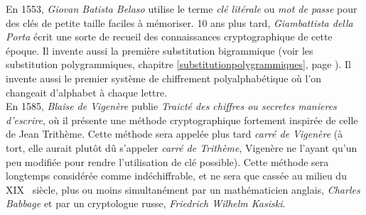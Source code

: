 



En 1553, \emph{Giovan Batista Belaso} utilise le terme \emph{clé
  litérale} ou \emph{mot de passe} pour des clés de petite taille
faciles à mémoriser. %
10 ans plus tard, \emph{Giambattista della Porta} écrit une sorte
de recueil des connaissances cryptographique de cette époque. Il
invente aussi la première substitution bigrammique (voir les
substitution polygrammiques, chapitre
\ref{substitutionpolygrammiques}, page
\pageref{substitutionpolygrammiques}). Il invente aussi le premier
système de chiffrement polyalphabétique où l'on changeait d'alphabet à
chaque lettre. \\

En 1585, \emph{Blaise de Vigenère} publie \emph{Traicté des chiffres
  ou secretes manieres d'escrire}, où il présente une méthode
cryptographique fortement inspirée de celle de Jean Trithème. Cette
méthode sera appelée plus tard \emph{carré de Vigenère} (à tort,
elle aurait plutôt dû s'appeler \emph{carré de Trithème}, Vigenère ne
l'ayant qu'un peu modifiée pour rendre l'utilisation de clé possible).
Cette méthode sera longtemps considérée comme indéchiffrable, et ne
sera que cassée au milieu du XIX\ieme~ siècle, plus ou moins
simultanément par un mathématicien anglais, \emph{Charles Babbage} et
par un cryptologue russe, \emph{Friedrich Wilhelm Kasiski}. \\

